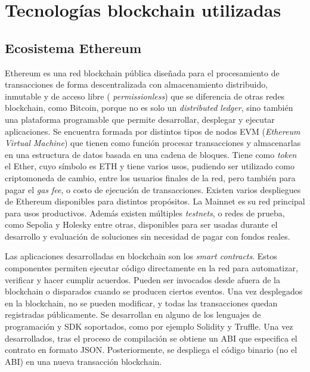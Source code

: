 \section{Tecnologías blockchain utilizadas}



\subsection{Ecosistema Ethereum}

Ethereum \citep{ethereum} es una red blockchain pública diseñada para el procesamiento de transacciones de forma descentralizada con almacenamiento distribuido, inmutable y de acceso libre ( \textit{permissionless}) que se diferencia de otras redes blockchain, como Bitcoin, porque no es solo un \textit{distributed ledger}, sino también una plataforma programable que permite desarrollar, desplegar y ejecutar aplicaciones. Se encuentra formada por distintos tipos de nodos EVM (\textit{Ethereum Virtual Machine}) \citep{evm} que tienen como función procesar transacciones y almacenarlas en una estructura de datos basada en una cadena de bloques. Tiene como \textit{token} el Ether, cuyo símbolo es ETH y tiene varios usos, pudiendo ser utilizado como criptomoneda de cambio, entre los usuarios finales de la red, pero también para pagar el \textit{gas fee}, o costo de ejecución de transacciones. 
Existen varios despliegues de Ethereum disponibles para distintos propósitos. La Mainnet \citep{mainnet} es su red principal para usos productivos. Además existen múltiples \textit{testnets}, o redes de prueba, como Sepolia \citep{sepolia} y Holesky \citep{holesky} entre otras, disponibles para ser usadas durante el desarrollo y evaluación de soluciones sin necesidad de pagar con fondos reales. 


Las aplicaciones desarrolladas en blockchain son los \textit{smart contracts}. Estos componentes permiten ejecutar código directamente en la red para automatizar, verificar y hacer cumplir acuerdos. Pueden ser invocados desde afuera de la blockchain o disparados cuando se producen ciertos eventos. Una vez desplegados en la blockchain, no se pueden modificar, y todas las transacciones quedan registradas públicamente. 
Se desarrollan en alguno de los lenguajes de programación y SDK soportados, como por ejemplo Solidity y Truffle. Una vez desarrollados, tras el proceso de compilación se obtiene un ABI \citep{abi} que especifica el contrato en formato JSON. Posteriormente, se despliega el código binario (no el ABI) en una nueva transacción blockchain. 

